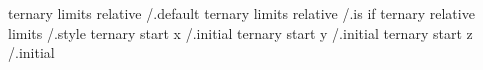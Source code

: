 ternary limits relative /.default
ternary limits relative /.is if
ternary relative limits /.style
ternary start x         /.initial
ternary start y         /.initial
ternary start z         /.initial

